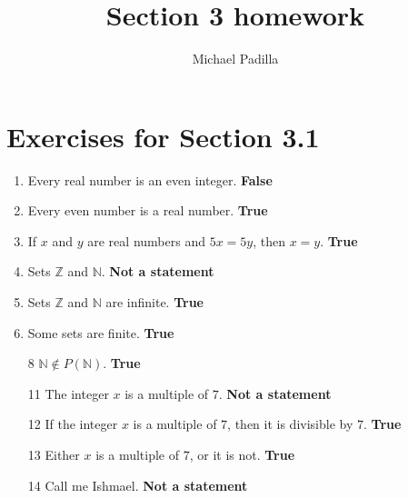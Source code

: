 \documentclass[12pt]{article}
\title{Section 3 homework}
\author{Michael Padilla}
\begin{document}
 
\maketitle
\section*{Exercises for Section 3.1}
\begin{enumerate}
    \item Every real number is an even integer. \textbf{False}
    \item Every even number is a real number. \textbf{True}
    \item If $x$ and $y$ are real numbers and $5x=5y$, then $x=y$. \textbf{True}
    \item Sets $\mathbb{Z}$ and $\mathbb{N}$. \textbf{Not a statement}
    \item Sets $\mathbb{Z}$ and $\mathbb{N}$ are infinite. \textbf{True}
    \item Some sets are finite. \textbf{True}
    \item[8] $\mathbb{N} \notin P(\mathbb{N})$. \textbf{True}
    \item[11] The integer $x$ is a multiple of $7$. \textbf{Not a statement}
    \item[12] If the integer $x$ is a multiple of $7$, then it is divisible by $7$. \textbf{True}
    \item[13] Either $x$ is a multiple of $7$, or it is not. \textbf{True}
    \item[14] Call me Ishmael. \textbf{Not a statement}
\end{enumerate}
\end{document}
